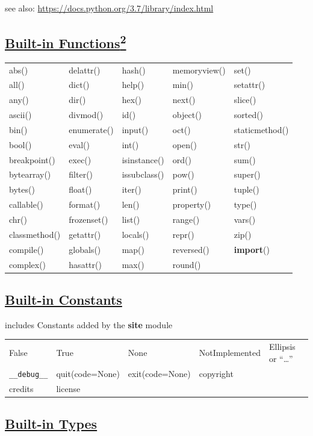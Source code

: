 \documentclass[]{book}
\theoremstyle{definition}
\theoremstyle{definition}
\theoremstyle{definition}
\theoremstyle{remark}
\begin{document}
see also: \url{https://docs.python.org/3.7/library/index.html}

\subsection{\texorpdfstring{\href{https://docs.python.org/3.7/library/functions.html}{Built-in
Functions\textsuperscript{2}}}{Built-in Functions2}}\label{built-in-functions2}

\begin{longtable}[]{@{}lllll@{}}
\toprule
abs() & delattr() & hash() & memoryview() & set()\tabularnewline
all() & dict() & help() & min() & setattr()\tabularnewline
any() & dir() & hex() & next() & slice()\tabularnewline
ascii() & divmod() & id() & object() & sorted()\tabularnewline
bin() & enumerate() & input() & oct() & staticmethod()\tabularnewline
bool() & eval() & int() & open() & str()\tabularnewline
breakpoint() & exec() & isinstance() & ord() & sum()\tabularnewline
bytearray() & filter() & issubclass() & pow() & super()\tabularnewline
bytes() & float() & iter() & print() & tuple()\tabularnewline
callable() & format() & len() & property() & type()\tabularnewline
chr() & frozenset() & list() & range() & vars()\tabularnewline
classmethod() & getattr() & locals() & repr() & zip()\tabularnewline
compile() & globals() & map() & reversed() &
\textbf{import}()\tabularnewline
complex() & hasattr() & max() & round() &\tabularnewline
\bottomrule
\end{longtable}

\subsection{\texorpdfstring{\href{https://docs.python.org/3.7/library/constants.html}{Built-in
Constants}}{Built-in Constants}}\label{built-in-constants}

includes Constants added by the \textbf{site} module

\begin{longtable}[]{@{}lllll@{}}
\toprule
False & True & None & NotImplemented & Ellipsis or
``\ldots{}''\tabularnewline
\texttt{\_\_debug\_\_} & quit(code=None) & exit(code=None) & copyright
&\tabularnewline
credits & license & & &\tabularnewline
\bottomrule
\end{longtable}

\subsection{\texorpdfstring{\href{https://docs.python.org/3.7/library/stdtypes.html}{Built-in
Types}}{Built-in Types}}\label{built-in-types}
\end{document}
